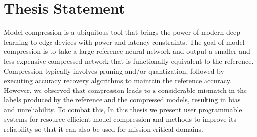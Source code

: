 \section{Thesis Statement}
Model compression is a ubiquitous tool that brings the power of modern deep learning 
to edge devices with power and latency constraints. The goal of model compression is 
to take a large reference neural network and output a smaller and less expensive 
compressed network that is functionally equivalent to the reference. Compression 
typically involves pruning and/or quantization, followed by executing accuracy recovery 
algorithms to maintain the reference accuracy. However, we observed that 
compression leads to a considerable mismatch in the labels produced by the reference and 
the compressed models, resulting in bias and unreliability. 
To combat this, In this thesis  we present user programmable systems for resource efficient 
model compression and methods to improve its reliability so that it can also be used for mission-critical  domains.
